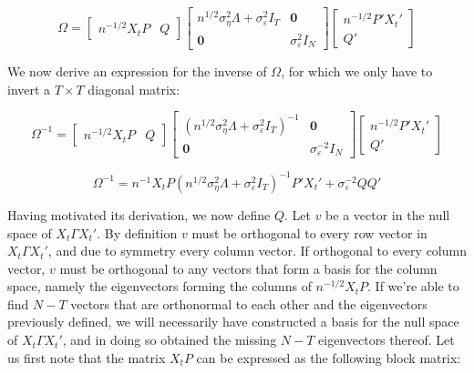 \begin{equation}
\label{eq:eigen_omega}
    \Omega = \left[\begin{array}{cc}
   n^{-1/2} X_t P & Q 
\end{array}\right] \left[\begin{array}{cc}
    n^{1/2}\sigma_\eta^2\Lambda + \sigma_\varepsilon^2I_T & \mathbf{0} \\
    \mathbf{0} & \sigma_\varepsilon^2I_N
\end{array}\right] \left[\begin{array}{cc}
    n^{-1/2}P'X_t'  \\
    Q' 
\end{array}\right]  
\end{equation} 

We now derive an expression for the inverse of $\Omega$, for which we only have to invert a $T \times T$ diagonal matrix:

$$ \Omega^{-1} =  \left[\begin{array}{cc}
   n^{-1/2} X_t P & Q
\end{array}\right] \left[\begin{array}{cc}
    (n^{1/2}\sigma_\eta^2\Lambda + \sigma_\varepsilon^2I_T)^{-1} & \mathbf{0} \\
    \mathbf{0} & \sigma_\varepsilon^{-2} I_N
\end{array}\right] \left[\begin{array}{cc}
    n^{-1/2}P'X_t'  \\
    Q' 
\end{array}\right]  $$

$$\Omega^{-1} =  
   n^{-1} X_t P (n^{1/2}\sigma_\eta^2\Lambda + \sigma_\varepsilon^2I_T)^{-1}P'X_t' + \sigma_\varepsilon^{-2}Q
   Q'$$

Having motivated its derivation, we now define $Q$. Let $v$ be a vector in the null space of $X_t\Gamma X_t'$. By definition $v$ must be orthogonal to every row vector in $X_t\Gamma X_t'$, and due to symmetry every column vector. If orthogonal to every column vector, $v$ must be orthogonal to any vectors that form a basis for the column space, namely the eigenvectors forming the columns of $n^{-1/2}X_tP$. If we're able to find $N-T$ vectors that are orthonormal to each other and the eigenvectors previously defined, we will necessarily have constructed a basis for the null space of $X_t\Gamma X_t'$, and in doing so obtained the missing $N-T$ eigenvectors thereof. Let us first note that the matrix $X_tP$ can be expressed as the following block matrix:


